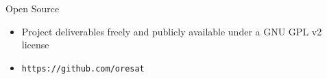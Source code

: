 \documentclass[slidestop,compress]{beamer}
\begin{document}
\begin{frame}[plain]
\begin{block}{\centering Open Source}
\hspace{1 mm}
\begin{itemize}
\item Project deliverables freely and publicly available under a GNU GPL v2 license
\item \texttt{https://github.com/oresat}
\\


\end{itemize}
\end{block}    
\end{frame}
\end{document}
